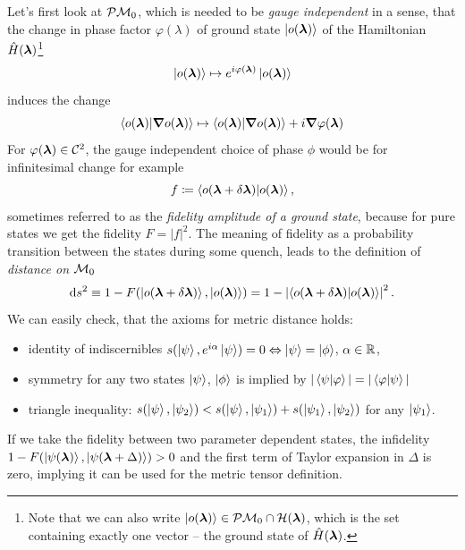 Let's first look at $\mathcal{P}\mathcal{M}_0$, which is needed to be \emph{gauge independent} in a sense, that the change in phase factor $\varphi(\lambda)$ of ground state $\ket{o({\bm\lambda})}$ of the Hamiltonian $\hat{H}({\bm\lambda})$\footnote{Note that we can also write $\ket{o({\bm\lambda})}\in \mathcal{P}\mathcal{M}_0\cap \mathcal{H}({\bm\lambda})$, which is the set containing exactly one vector -- the ground state of $\hat{H}({\bm\lambda})$.}
\begin{equation}
    \ket{o({\bm\lambda})}\mapsto e^{i\varphi({\bm\lambda})} \ket{o({\bm\lambda})}
\end{equation}
 induces the change 
\begin{equation}
        \braket{o({\bm\lambda})|\bm \nabla o({\bm\lambda})}\mapsto \braket{o({\bm\lambda})|\bm \nabla o({\bm\lambda})} + i\bm \nabla \varphi({\bm\lambda}) 
\end{equation} 
For $\varphi({\bm\lambda})\in \mathcal C^2$, the gauge independent choice of phase $\phi$ would be for infinitesimal change for example
\begin{equation}
    f\coloneqq \braket{o(\bm{{\bm\lambda}}+\delta\bm{{\bm\lambda}})|o(\bm{{\bm\lambda}})},
    \label{eq:fidelityDefinition}
\end{equation}
sometimes referred to as the \emph{fidelity amplitude of a ground state}, because for pure states we get the fidelity $F=|f|^2$. The meaning of fidelity as a probability transition between the states during some quench, leads to the definition of \emph{distance on $\mathcal{M}_0$}
\begin{equation}
    \mathrm{d} s^2 \equiv 1-F(\ket{o(\bm{{\bm\lambda}}+\delta\bm{{\bm\lambda}})},\ket{o({\bm\lambda})})= 1-\left|\braket{o(\bm{{\bm\lambda}}+\delta\bm{{\bm\lambda}})|o(\bm{{\bm\lambda}})}\right|^2.
    \label{eq:distanceOnM0}
\end{equation}
We can easily check, that the axioms for metric distance holds:
\begin{itemize}
    \item identity of indiscernibles $s(\ket{\psi},e^{i\alpha}\ket{\psi}) = 0 \Leftrightarrow \ket{\psi}=\ket{\phi}$, $\alpha\in\mathbb{R}$,
    \item symmetry for any two states $\ket{\psi}$, $\ket{\phi}$ is implied by $|\braket{\psi|\varphi}|=|\braket{\varphi|\psi}|$
    \item triangle inequality: $s(\ket{\psi},\ket{\psi_2}) <s(\ket{\psi},\ket{\psi_1}) + s(\ket{\psi_1},\ket{\psi_2})$ for any $\ket{\psi_1}$.
\end{itemize}
If we take the fidelity between two parameter dependent states, the infidelity $1-F(\ket{\psi({\bm\lambda})},\ket{\psi({\bm\lambda}+\Delta)})>0$ and the first term of Taylor expansion in $\Delta$ is zero, implying it can be used for the metric tensor definition.

